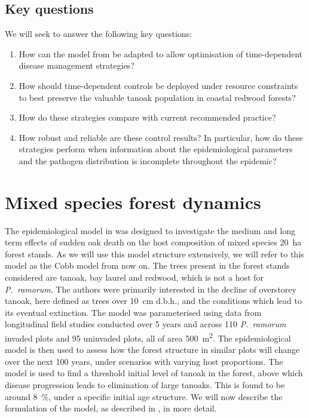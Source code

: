 \subsection{Key questions}

We will seek to answer the following key questions:
\begin{enumerate}
    \item How can the model from \citet{cobb_ecosystem_2012} be adapted to allow optimisation of time-dependent disease management strategies?
    \item How should time-dependent controls be deployed under resource constraints to best preserve the valuable tanoak population in coastal redwood forests?
    \item How do these strategies compare with current recommended practice?
    \item How robust and reliable are these control results? In particular, how do these strategies perform when information about the epidemiological parameters and the pathogen distribution is incomplete throughout the epidemic?
\end{enumerate}

\newpage
{}\label{sec:ch5:CobbModel}
\section{Mixed species forest dynamics}

The epidemiological model in \citet{cobb_ecosystem_2012} was designed to investigate the medium and long term effects of sudden oak death on the host composition of mixed species \SI{20}{\hectare} forest stands. As we will use this model structure extensively, we will refer to this model as the Cobb model from now on. The trees present in the forest stands considered are tanoak, bay laurel and redwood, which is not a host for \textit{P.~ramorum}. The authors were primarily interested in the decline of overstorey tanoak, here defined as trees over \SI{10}{\cm} d.b.h., and the conditions  which lead to its eventual extinction. The model was parameterised using data from longitudinal field studies conducted over 5 years and across 110 \textit{P.~ramorum} invaded plots and 95 uninvaded plots, all of area \SI{500}{\metre\squared}. The epidemiological model is then used to assess how the forest structure in similar plots will change over the next 100 years, under scenarios with varying host proportions. The model is used to find a threshold initial level of tanoak in the forest, above which disease progression leads to elimination of large tanoaks. This is found to be around \SI{8}{\percent}, under a specific initial age structure. We will now describe the formulation of the model, as described in \citet{cobb_ecosystem_2012}, in more detail.

